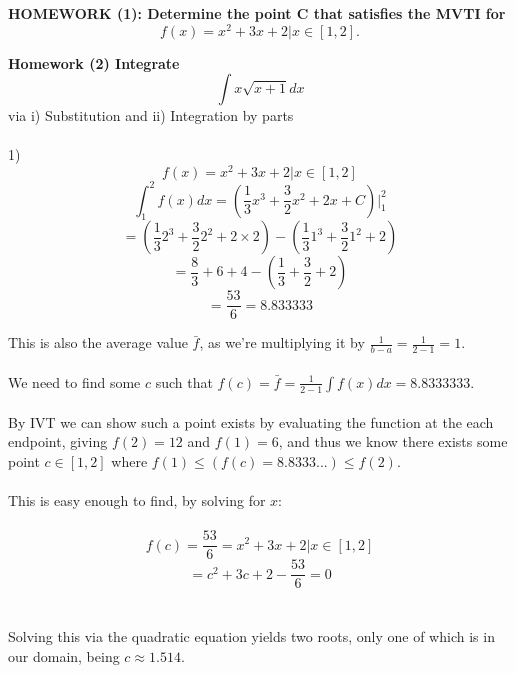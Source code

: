 \documentclass[twocolumn]{article}
\begin{document}
  \textbf{HOMEWORK (1): Determine the point C that satisfies the MVTI for $$f(x) = x^2 + 3x + 2 | x\in[1,2]. $$}

   \textbf{Homework (2) Integrate $$\int x \sqrt{x+1} dx $$} via i) Substitution and ii) Integration by parts \\\\
   1)  $$f(x) = x^2 + 3x + 2 | x\in[1,2] $$
   $$\int_1^2 f(x) dx = (\frac{1}{3}x^3 + \frac{3}{2} x^2 + 2x + C)\Bigg|^2_1$$
   $$= (\frac{1}{3}2^3 + \frac{3}{2} 2^2 + 2\times2) - (\frac{1}{3}1^3 + \frac{3}{2} 1^2 + 2)$$
   $$= \frac{8}{3} + 6 + 4 - (\frac{1}{3} + \frac{3}{2} + 2)$$
   $$= \frac{53}{6} = 8.833333$$

   This is also the average value $\bar{f}$, as we're multiplying it by $\frac{1}{b-a} = \frac{1}{2-1} = 1$.\\\\

   We need to find some $c$ such that $f(c) = \bar{f} = \frac{1}{2-1} \int f(x) dx = 8.8333333$.\\\\ By IVT we can show such a point exists by evaluating the function at the each endpoint, giving $f(2) = 12$ and $f(1) = 6$, and thus we know there exists some point $c\in[1,2]$ where $f(1)\leq(f(c)=8.8333...)\leq f(2)$. \\\\ This is easy enough to find, by solving for $x$: \\\\
   $$f(c) =\frac{53}{6} = x^2 + 3x + 2 | x \in [1,2]$$
   $$= c^2 + 3c + 2 - \frac{53}{6} = 0$$ \\\\ Solving this via the quadratic equation yields two roots, only one of which is in our domain, being $c \approx 1.514$. \\\\\\
\end{document}
